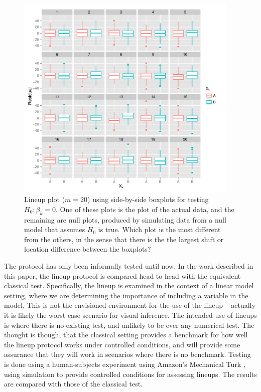 \documentclass{article}
\begin{document}
\begin{figure}[htp]
   \centering
       \includegraphics[width=0.95\textwidth]{test_category.pdf}
       \caption{Lineup plot ($m=20$) using side-by-side boxplots for testing $H_0: \beta_k=0$. One of these plots is the plot of the actual data, and the remaining are null plots, produced by simulating data from a null model that assumes $H_0$ is true. Which plot is the most different from the others, in the sense that there is the the largest shift or location difference between the boxplots?}
       \label{fig:test_category}
\end{figure}

The protocol has only been informally tested until now. In the work described in this paper, the lineup protocol is compared head to head with the equivalent classical test. Specifically, the lineup is examined in the context of a linear model setting, where we are determining the importance of including a variable in the model. This is not the envisioned environment for the use of the lineup -- actually it is likely the worst case scenario for visual inference. The intended use of lineups is where there is no existing test, and unlikely to be ever any numerical test. The thought is though, that the classical setting provides a benchmark for how well the lineup protocol works under controlled conditions, and will provide some assurance that they will work in scenarios where there is no benchmark. Testing is done using a human-subjects experiment using Amazon's Mechanical Turk \citep{turk}, using simulation to provide controlled conditions for assessing lineups. The results are compared with those of the classical test. 
\end{document}
